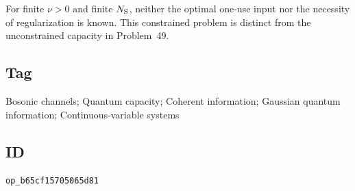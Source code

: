 For finite $\nu>0$ and finite $N_{\rm S}$, neither the optimal one-use input
nor the necessity of regularization is known.  This constrained problem is
distinct from the unconstrained capacity in Problem~49.

\subsection*{Tag}

Bosonic channels; Quantum capacity; Coherent information;
Gaussian quantum information; Continuous-variable systems

\subsection*{ID}

\texttt{op\_b65cf15705065d81}
